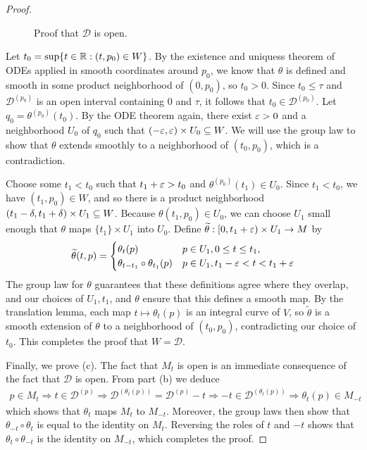 \begin{proof}
\begin{figure}[htbp]
\caption{Proof that $\mathcal{D}$ is open.}
\end{figure}\par
Let $t_0=\sup\{t\in\mathbb{R}:(t,p_0)\in W\}$. By the existence and uniquess theorem of ODEs applied in
smooth coordinates around $p_0$, we know that $\theta$ is defined and smooth in some product neighborhood of $(0,p_0)$, so $t_0>0$. Since $t_0\leq\tau$ and $\mathcal{D}^{(p_0)}$ is an open interval containing $0$ and $\tau$, it follows that $t_0\in\mathcal{D}^{(p_0)}$. Let $q_0=\theta^{(p_0)}(t_0)$. By the ODE theorem again, there exist $\varepsilon>0$ and a neighborhood $U_0$ of $q_0$ such that $(-\varepsilon,\varepsilon)\times U_0\subseteq W$. We will use the group law to show that $\theta$ extends smoothly to a neighborhood of $(t_0,p_0)$, which is a contradiction.\par
Choose some $t_1<t_0$ such that $t_1+\varepsilon>t_0$ and $\theta^{(p_0)}(t_1)\in U_0$. Since $t_1<t_0$, we have $(t_1,p_0)\in W$, and so there is a product neighborhood $(t_1-\delta,t_1+\delta)\times U_1\subseteq W$. Because $\theta(t_1,p_0)\in U_0$, we can choose $U_1$ small enough that $\theta$ maps $\{t_1\}\times U_1$ into $U_0$. Define $\widetilde{\theta}:[0,t_1+\varepsilon)\times U_1\to M$ by
\[\widetilde{\theta}(t,p)=\begin{cases}
\theta_t(p)&p\in U_1,0\leq t\leq t_1,\\
\theta_{t-t_1}\circ\theta_{t_1}(p)&p\in U_1,t_1-\varepsilon<t<t_1+\varepsilon
\end{cases}\]
The group law for $\theta$ guarantees that these definitions agree where they overlap, and our choices of $U_1,t_1$, and $\theta$ ensure that this defines a smooth map. By the translation lemma, each map $t\mapsto\theta_t(p)$ is an integral curve of $V$, so $\widetilde{\theta}$ is a smooth extension of $\theta$ to a neighborhood of $(t_0,p_0)$, contradicting our choice of $t_0$. This completes the proof that $W=\mathcal{D}$.\par
Finally, we prove (c). The fact that $M_t$ is open is an immediate consequence of the fact that $\mathcal{D}$ is open. From part (b) we deduce
\begin{align*}
p\in M_t\Rightarrow t\in\mathcal{D}^{(p)}\Rightarrow\mathcal{D}^{(\theta_t(p))}=\mathcal{D}^{(p)}-t\Rightarrow-t\in\mathcal{D}^{(\theta_t(p))}\Rightarrow\theta_t(p)\in M_{-t}
\end{align*}
which shows that $\theta_t$ maps $M_t$ to $M_{-t}$. Moreover, the group laws then show that $\theta_{-t}\circ\theta_{t}$ is equal to the identity on $M_t$. Reversing the roles of $t$ and $-t$ shows that $\theta_{t}\circ\theta_{-t}$ is the identity on $M_{-t}$, which completes the proof.
\end{proof}

